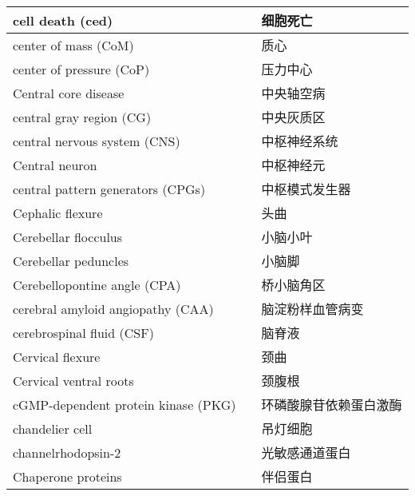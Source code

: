 \begin{longtable}{lll}
	\midrule
	cell death (ced)  && 细胞死亡  \\
	
	\midrule
	center of mass (CoM)   && 质心  \\
	
	\midrule
	center of pressure (CoP)   && 压力中心  \\
	
	\midrule
	Central core disease  && 中央轴空病  \\
	
	\midrule
	central gray region (CG)  && 中央灰质区  \\
	
	\midrule
	central nervous system (CNS)  && 中枢神经系统  \\
	
	\midrule
	Central neuron   && 中枢神经元  \\
	
	\midrule
	central pattern generators (CPGs)   && 中枢模式发生器  \\
	
	\midrule
	Cephalic flexure   && 头曲  \\
	
	\midrule
	Cerebellar flocculus   && 小脑小叶  \\
	
	\midrule
	Cerebellar peduncles   && 小脑脚  \\
	
	\midrule
	Cerebellopontine angle (CPA)   && 桥小脑角区  \\
	
	\midrule
	cerebral amyloid angiopathy (CAA)   && 脑淀粉样血管病变  \\
	
	\midrule
	cerebrospinal fluid (CSF)   && 脑脊液  \\
	
	\midrule
	Cervical flexure   && 颈曲  \\
	
	\midrule
	Cervical ventral roots   && 颈腹根  \\
	
	\midrule
	cGMP-dependent protein kinase (PKG)   && 环磷酸腺苷依赖蛋白激酶  \\
	
	\midrule
	chandelier cell   && 吊灯细胞  \\
	
	\midrule
	channelrhodopsin-2   && 光敏感通道蛋白  \\
	
	\midrule
	Chaperone proteins   && 伴侣蛋白  \\
	

\end{longtable}

